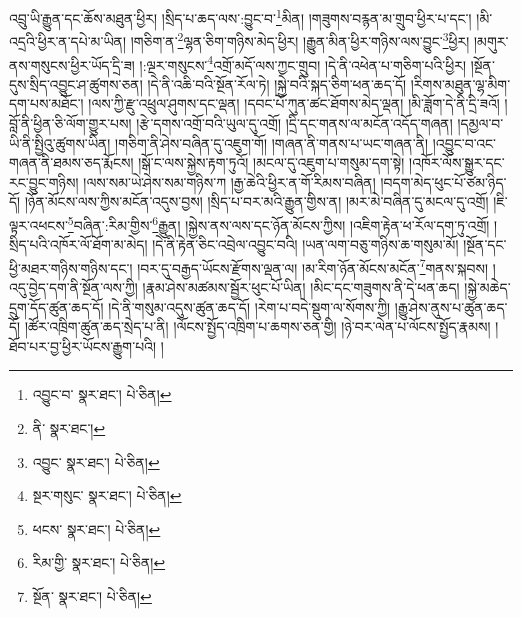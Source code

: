 འབྲུ་ཡི་རྒྱུན་དང་ཆོས་མཐུན་ཕྱིར། །སྲིད་པ་ཆད་ལས་:བྱུང་བ་\footnote{འབྱུང་བ་  སྣར་ཐང་།  པེ་ཅིན། }མིན། །གཟུགས་བརྙན་མ་གྲུབ་ཕྱིར་པ་དང་། །མི་འདྲའི་ཕྱིར་ན་དཔེ་མ་ཡིན། །གཅིག་ན་\footnote{ནི་  སྣར་ཐང་། }ལྷན་ཅིག་གཉིས་མེད་ཕྱིར། །རྒྱུན་མིན་ཕྱིར་གཉིས་ལས་བྱུང་\footnote{འབྱུང་  སྣར་ཐང་།  པེ་ཅིན། }ཕྱིར། །མགུར་ནས་གསུངས་ཕྱིར་ཡོད་དྲི་ཟ། །:ལྔར་གསུངས་\footnote{སྔར་གསུང་  སྣར་ཐང་།  པེ་ཅིན། }འགྲོ་མདོ་ལས་ཀྱང་གྲུབ། །དེ་ནི་འཕེན་པ་གཅིག་པའི་ཕྱིར། །སྔོན་དུས་སྲིད་འབྱུང་ཤ་ཚུགས་ཅན། །དེ་ནི་འཆི་བའི་སྔོན་རོལ་ཏེ། །སྐྱེ་བའི་སྐད་ཅིག་ཕན་ཆད་དོ། །རིགས་མཐུན་ལྷ་མིག་དག་པས་མཐོང་། །ལས་ཀྱི་རྫུ་འཕྲུལ་ཤུགས་དང་ལྡན། །དབང་པོ་ཀུན་ཚང་ཐོགས་མེད་ལྡན། །མི་ཟློག་དེ་ནི་དྲི་ཟའོ། །བློ་ནི་ཕྱིན་ཅི་ལོག་གྱུར་པས། །རྩེ་དགས་འགྲོ་བའི་ཡུལ་དུ་འགྲོ། །དྲི་དང་གནས་ལ་མངོན་འདོད་གཞན། །དམྱལ་བ་ཡི་ནི་སྤྱིའུ་ཚུགས་ཡིན། །གཅིག་ནི་ཤེས་བཞིན་དུ་འཇུག་གོ། །གཞན་ནི་གནས་པ་ཡང་གཞན་ནི། །འབྱུང་བ་འང་གཞན་ནི་ཐམས་ཅད་རྨོངས། །སྒོ་ང་ལས་སྐྱེས་རྟག་ཏུའོ། །མངལ་དུ་འཇུག་པ་གསུམ་དག་སྟེ། །འཁོར་ལོས་སྒྱུར་དང་རང་བྱུང་གཉིས། །ལས་སམ་ཡེ་ཤེས་སམ་གཉིས་ཀ །རྒྱ་ཆེའི་ཕྱིར་ན་གོ་རིམས་བཞིན། །བདག་མེད་ཕུང་པོ་ཙམ་ཉིད་དོ། །ཉོན་མོངས་ལས་ཀྱིས་མངོན་འདུས་བྱས། །སྲིད་པ་བར་མའི་རྒྱུན་གྱིས་ན། །མར་མེ་བཞིན་དུ་མངལ་དུ་འགྲོ། །ཇི་ལྟར་འཕངས་\footnote{ཕངས་  སྣར་ཐང་།  པེ་ཅིན། }བཞིན་:རིམ་གྱིས་\footnote{རིམ་གྱི་  སྣར་ཐང་།  པེ་ཅིན། }རྒྱུན། །སྐྱེས་ནས་ལས་དང་ཉོན་མོངས་ཀྱིས། །འཇིག་རྟེན་ཕ་རོལ་དག་ཏུ་འགྲོ། །སྲིད་པའི་འཁོར་ལོ་ཐོག་མ་མེད། །དེ་ནི་རྟེན་ཅིང་འབྲེལ་འབྱུང་བའི། །ཡན་ལག་བཅུ་གཉིས་ཆ་གསུམ་མོ། །སྔོན་དང་ཕྱི་མཐར་གཉིས་གཉིས་དང་། །བར་དུ་བརྒྱད་ཡོངས་རྫོགས་ལྡན་ལ། །མ་རིག་ཉོན་མོངས་མངོན་\footnote{སྔོན་  སྣར་ཐང་།  པེ་ཅིན། }གནས་སྐབས། །འདུ་བྱེད་དག་ནི་སྔོན་ལས་ཀྱི། །རྣམ་ཤེས་མཚམས་སྦྱོར་ཕུང་པོ་ཡིན། །མིང་དང་གཟུགས་ནི་དེ་ཕན་ཆད། །སྐྱེ་མཆེད་དྲུག་དོད་ཚུན་ཆད་དོ། །དེ་ནི་གསུམ་འདུས་ཚུན་ཆད་དོ། །རེག་པ་བདེ་སྡུག་ལ་སོགས་ཀྱི། །རྒྱུ་ཤེས་ནུས་པ་ཚུན་ཆད་དོ། །ཚོར་འཁྲིག་ཚུན་ཆད་སྲེད་པ་ནི། །ལོངས་སྤྱོད་འཁྲིག་པ་ཆགས་ཅན་གྱི། །ཉེ་བར་ལེན་པ་ལོངས་སྤྱོད་རྣམས། །ཐོབ་པར་བྱ་ཕྱིར་ཡོངས་རྒྱུག་པའི། །
